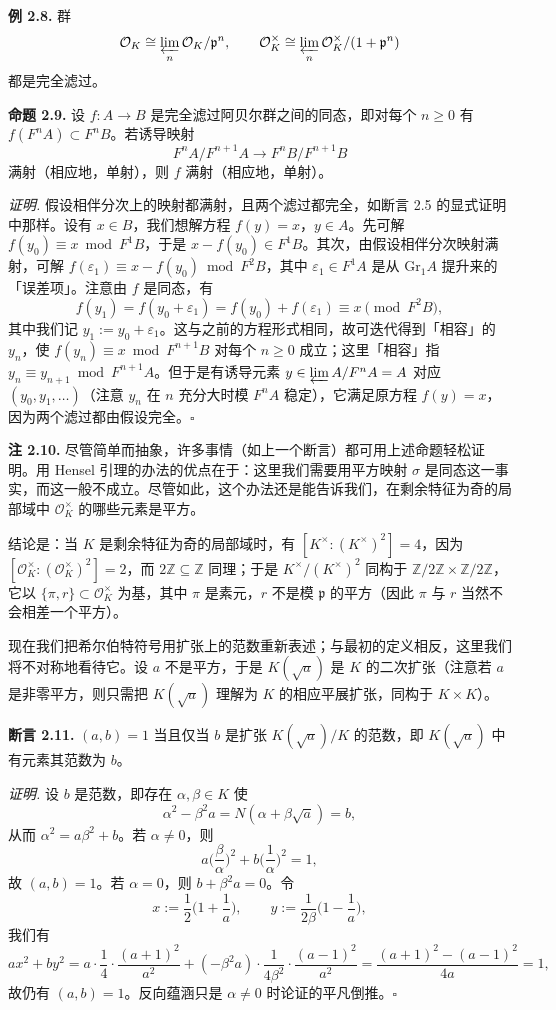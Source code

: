 \textbf{例 2.8.} 群
\[
  \mathcal{O}_K\cong\varprojlim_n \mathcal{O}_K/\mathfrak{p}^n,
  \qquad
  \mathcal{O}_K^{\times}\cong\varprojlim_n \mathcal{O}_K^{\times}/(1+\mathfrak{p}^n)
\]
都是完全滤过。

\textbf{命题 2.9.} 设 $f\colon A\to B$ 是完全滤过阿贝尔群之间的同态，即对每个 $n\geq 0$ 有 $f(F^nA)\subset F^nB$。若诱导映射
\[
  F^nA/F^{n+1}A\to F^nB/F^{n+1}B
\]
满射（相应地，单射），则 $f$ 满射（相应地，单射）。

\textit{证明.} 假设相伴分次上的映射都满射，且两个滤过都完全，如断言 2.5 的显式证明中那样。设有 $x\in B$，我们想解方程 $f(y)=x$，$y\in A$。先可解 $f(y_0)\equiv x\bmod F^1B$，于是 $x-f(y_0)\in F^1B$。其次，由假设相伴分次映射满射，可解 $f(\varepsilon_1)\equiv x-f(y_0)\bmod F^2B$，其中 $\varepsilon_1\in F^1A$ 是从 $\mathrm{Gr}_1A$ 提升来的「误差项」。注意由 $f$ 是同态，有
\[
  f(y_1)=f(y_0+\varepsilon_1)=f(y_0)+f(\varepsilon_1)\equiv x \pmod{F^2B},
\]
其中我们记 $y_1:=y_0+\varepsilon_1$。这与之前的方程形式相同，故可迭代得到「相容」的 $y_n$，使 $f(y_n)\equiv x\bmod F^{n+1}B$ 对每个 $n\geq 0$ 成立；这里「相容」指 $y_n\equiv y_{n+1}\bmod F^{n+1}A$。但于是有诱导元素 $y\in\varprojlim A/F^nA=A$ 对应 $(y_0,y_1,\ldots)$（注意 $y_n$ 在 $n$ 充分大时模 $F^nA$ 稳定），它满足原方程 $f(y)=x$，因为两个滤过都由假设完全。\hfill$\square$

\textbf{注 2.10.} 尽管简单而抽象，许多事情（如上一个断言）都可用上述命题轻松证明。用 Hensel 引理的办法的优点在于：这里我们需要用平方映射 $\sigma$ 是同态这一事实，而这一般不成立。尽管如此，这个办法还是能告诉我们，在剩余特征为奇的局部域中 $\mathcal{O}_K^{\times}$ 的哪些元素是平方。

结论是：当 $K$ 是剩余特征为奇的局部域时，有 $[K^{\times}:(K^{\times})^2]=4$，因为 $[\mathcal{O}_K^{\times}:(\mathcal{O}_K^{\times})^2]=2$，而 $2\mathbb{Z}\subseteq\mathbb{Z}$ 同理；于是 $K^{\times}/(K^{\times})^2$ 同构于 $\mathbb{Z}/2\mathbb{Z}\times\mathbb{Z}/2\mathbb{Z}$，它以 $\{\pi,r\}\subset\mathcal{O}_K^{\times}$ 为基，其中 $\pi$ 是素元，$r$ 不是模 $\mathfrak{p}$ 的平方（因此 $\pi$ 与 $r$ 当然不会相差一个平方）。

现在我们把希尔伯特符号用扩张上的范数重新表述；与最初的定义相反，这里我们将不对称地看待它。设 $a$ 不是平方，于是 $K(\sqrt{a})$ 是 $K$ 的二次扩张（注意若 $a$ 是非零平方，则只需把 $K(\sqrt{a})$ 理解为 $K$ 的相应平展扩张，同构于 $K\times K$）。

\textbf{断言 2.11.} $(a,b)=1$ 当且仅当 $b$ 是扩张 $K(\sqrt{a})/K$ 的范数，即 $K(\sqrt{a})$ 中有元素其范数为 $b$。

\textit{证明.} 设 $b$ 是范数，即存在 $\alpha,\beta\in K$ 使
\[
  \alpha^2-\beta^2a=N(\alpha+\beta\sqrt{a})=b,
\]
从而 $\alpha^2=a\beta^2+b$。若 $\alpha\neq 0$，则
\[
  a\Big(\frac{\beta}{\alpha}\Big)^2+b\Big(\frac{1}{\alpha}\Big)^2=1,
\]
故 $(a,b)=1$。若 $\alpha=0$，则 $b+\beta^2a=0$。令
\[
  x:=\frac{1}{2}\Big(1+\frac{1}{a}\Big),
  \qquad
  y:=\frac{1}{2\beta}\Big(1-\frac{1}{a}\Big),
\]
我们有
\[
  ax^2+by^2
  =a\cdot\frac{1}{4}\cdot\frac{(a+1)^2}{a^2}
  +(-\beta^2a)\cdot\frac{1}{4\beta^2}\cdot\frac{(a-1)^2}{a^2}
  =\frac{(a+1)^2-(a-1)^2}{4a}=1,
\]
故仍有 $(a,b)=1$。反向蕴涵只是 $\alpha\neq 0$ 时论证的平凡倒推。\hfill$\square$

